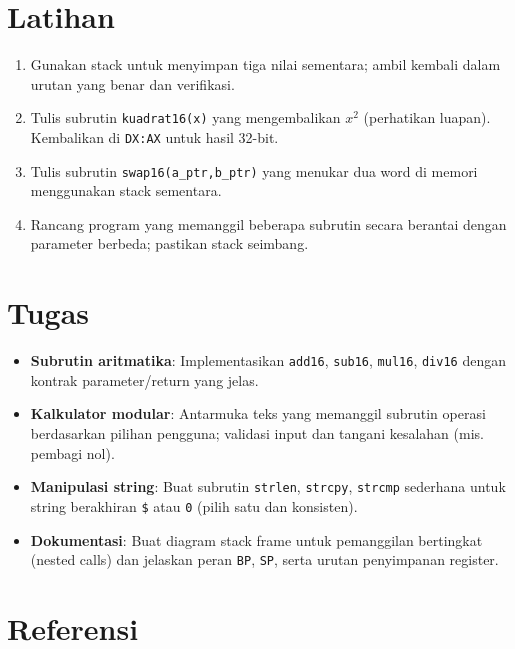 \section{Latihan}
\begin{enumerate}
  \item Gunakan stack untuk menyimpan tiga nilai sementara; ambil kembali dalam urutan yang benar dan verifikasi.
  \item Tulis subrutin \texttt{kuadrat16(x)} yang mengembalikan \(x^2\) (perhatikan luapan). Kembalikan di \texttt{DX:AX} untuk hasil 32-bit.
  \item Tulis subrutin \texttt{swap16(a\_ptr,b\_ptr)} yang menukar dua word di memori menggunakan stack sementara.
  \item Rancang program yang memanggil beberapa subrutin secara berantai dengan parameter berbeda; pastikan stack seimbang.
\end{enumerate}

\section{Tugas}
\begin{itemize}
  \item \textbf{Subrutin aritmatika}: Implementasikan \texttt{add16}, \texttt{sub16}, \texttt{mul16}, \texttt{div16} dengan kontrak parameter/return yang jelas.
  \item \textbf{Kalkulator modular}: Antarmuka teks yang memanggil subrutin operasi berdasarkan pilihan pengguna; validasi input dan tangani kesalahan (mis. pembagi nol).
  \item \textbf{Manipulasi string}: Buat subrutin \texttt{strlen}, \texttt{strcpy}, \texttt{strcmp} sederhana untuk string berakhiran \texttt{\$} atau \texttt{0} (pilih satu dan konsisten).
  \item \textbf{Dokumentasi}: Buat diagram stack frame untuk pemanggilan bertingkat (nested calls) dan jelaskan peran \texttt{BP}, \texttt{SP}, serta urutan penyimpanan register.
\end{itemize}

\section{Referensi}
